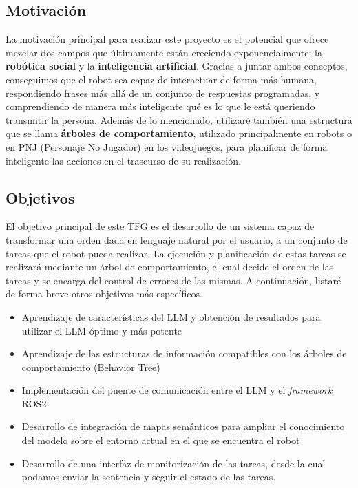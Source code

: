 \documentclass[../main.tex]{subfiles}
\begin{document}
\subsection{Motivación}
La motivación principal para realizar este proyecto es el potencial que ofrece mezclar dos campos que últimamente están creciendo exponencialmente: la \textbf{robótica social} y la \textbf{inteligencia artificial}. Gracias 
a juntar ambos conceptos, conseguimos que el robot sea capaz de interactuar de forma más humana, respondiendo frases más allá de un conjunto de respuestas programadas, y comprendiendo
de manera más inteligente qué es lo que le está queriendo transmitir la persona. Además de lo mencionado, utilizaré también una estructura que se llama \textbf{árboles de comportamiento}, utilizado principalmente
en robots o en PNJ (Personaje No Jugador) en los videojuegos, para planificar de forma inteligente las acciones en el trascurso de su realización.

\subsection{Objetivos}

El objetivo principal de este TFG es el desarrollo de un sistema capaz de transformar una orden dada en lenguaje natural por el usuario, a un conjunto
de tareas que el robot pueda realizar. La ejecución y planificación de estas tareas se realizará mediante un árbol de comportamiento, el cual decide el orden de las tareas
y se encarga del control de errores de las mismas. A continuación, listaré de forma breve otros objetivos más específicos.

\begin{itemize}
    \item Aprendizaje de características del LLM y obtención de resultados para utilizar el LLM óptimo y más potente
    \item Aprendizaje de las estructuras de información compatibles con los árboles de comportamiento (Behavior Tree)
    
    \item Implementación del puente de comunicación entre el LLM y el \textit{framework} ROS2
    \item Desarrollo de integración de mapas semánticos para ampliar el conocimiento del modelo sobre el entorno actual en el que se encuentra el robot
    \item Desarrollo de una interfaz de monitorización de las tareas, desde la cual podamos enviar la sentencia y seguir el estado de las tareas.
\end{itemize}
\end{document}
